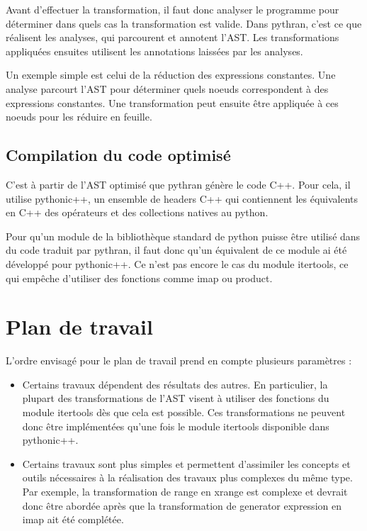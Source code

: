 \documentclass[a4paper]{article}
\begin{document}
Avant d'effectuer la transformation, il faut donc analyser le programme pour déterminer dans quels cas la transformation est valide. Dans pythran, c'est ce que réalisent les analyses, qui parcourent et annotent l'AST. Les transformations appliquées ensuites utilisent les annotations laissées par les analyses.

Un exemple simple est celui de la réduction des expressions constantes. Une analyse parcourt l'AST pour déterminer quels noeuds correspondent à des expressions constantes. Une transformation peut ensuite être appliquée à ces noeuds pour les réduire en feuille.

\subsection{Compilation du code optimisé}

\label{pythonicpp}

C'est à partir de l'AST optimisé que pythran génère le code C++. Pour cela, il utilise pythonic++, un ensemble de headers C++ qui contiennent les équivalents en C++ des opérateurs et des collections natives au python. 

Pour qu'un module de la bibliothèque standard de python puisse être utilisé dans du code traduit par pythran, il faut donc qu'un équivalent de ce module ai été développé pour pythonic++. Ce n'est pas encore le cas du module itertools, ce qui empêche d'utiliser des fonctions comme imap ou product.

\section{Plan de travail}

L'ordre envisagé pour le plan de travail prend en compte plusieurs paramètres :

\begin{itemize}
\item Certains travaux dépendent des résultats des autres. En particulier, la plupart des transformations de l'AST visent à utiliser des fonctions du module itertools dès que cela est possible. Ces transformations ne peuvent donc être implémentées qu'une fois le module itertools disponible dans pythonic++.
\item Certains travaux sont plus simples et permettent d'assimiler les concepts et outils nécessaires à la réalisation des travaux plus complexes du même type. Par exemple, la transformation de range en xrange est complexe et devrait donc être abordée après que la transformation de generator expression en imap ait été complétée.
\end{itemize}
\end{document}
